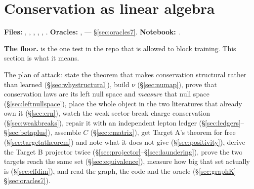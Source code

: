 %

\section{Conservation as linear algebra}
\label{part:conservation}

\begin{repopointer}
\textbf{Files:} , ,
, , ,
. \quad
\textbf{Oracles:} ,
 --- \S\ref{sec:oracles7}. \quad
\textbf{Notebook:} .
\end{repopointer}

\textbf{The floor.}  is the one test in the
repo that is allowed to block training. This section is what it means.

The plan of attack: state the theorem that makes conservation structural rather
than learned (\S\ref{sec:whystructural}), build $\nu$ (\S\ref{sec:numap}),
prove that conservation laws are its left null space and \emph{measure} that
null space (\S\ref{sec:leftnullspace}), place the whole object in the two
literatures that already own it (\S\ref{sec:crn}), watch the weak sector break
charge conservation (\S\ref{sec:weakbreaks}), repair it with an independent
lepton ledger (\S\ref{sec:ledgers}--\S\ref{sec:betaplus}), assemble $C$
(\S\ref{sec:cmatrix}), get Target A's theorem for free
(\S\ref{sec:targetatheorem}) and note what it does not give
(\S\ref{sec:positivity}), derive the Target B projector twice
(\S\ref{sec:projector}--\S\ref{sec:laundering}), prove the two targets reach the
same set (\S\ref{sec:equivalence}), measure how big that set actually is
(\S\ref{sec:effdim}), and read the graph, the code and the oracle
(\S\ref{sec:graphK}--\S\ref{sec:oracles7}).

